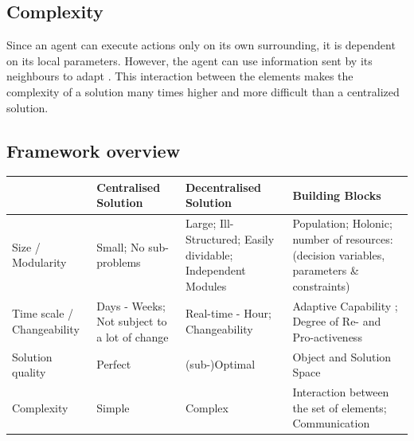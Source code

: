 \subsection{Complexity}
Since an agent can execute actions only on its own surrounding, it is dependent on its local parameters. However, the agent can use information sent by its neighbours to adapt \citep{pujolle2006autonomic}. This interaction between the elements makes the complexity of a solution many times higher and more difficult than a centralized solution.

\subsection{Framework overview}
\begin{tabular}{p{2cm}|p{2.5cm}|p{2.5cm}|p{2.5cm}}
	& Centralised Solution & Decentralised Solution & Building Blocks\\
	\hline \hline
	Size / Modularity & Small; No sub-problems & Large; Ill-Structured; Easily dividable; Independent Modules & Population; Holonic; number of resources: (decision variables, parameters \& constraints)\\
	\hline
	Time scale / Changeability & Days - Weeks; Not subject to a lot of change & Real-time - Hour; Changeability  & Adaptive Capability ; Degree of Re- and Pro-activeness\\
	\hline
	Solution quality & Perfect & (sub-)Optimal & Object and Solution Space\\
	\hline
	Complexity & Simple & Complex & Interaction between the set of elements; Communication
\end{tabular}

